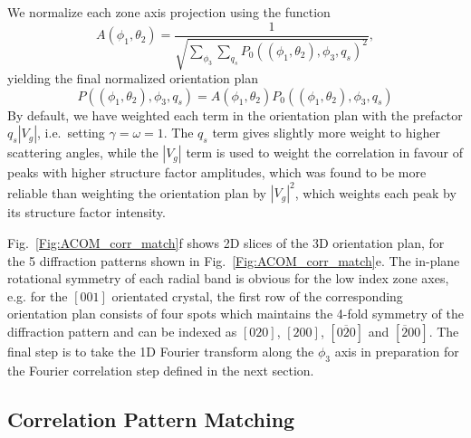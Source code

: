 \documentclass[%
 superscriptaddress,
 aip,
 amsmath,amssymb,
reprint,%
 author-year,%
longbibliography
]{revtex4-2}
\begin{document}
We normalize each zone axis projection using the function
\begin{equation}
    A(\phi_1, \theta_2) 
    = \frac{1}{\sqrt{
    \sum_{\phi_3}
    \sum_{q_s}
    {P_0((\phi_1, \theta_2), \phi_3, q_s)}^2
    }},
    \nonumber
\end{equation}
yielding the final normalized orientation plan
\begin{equation}
    P((\phi_1, \theta_2), \phi_3, q_s) = A(\phi_1, \theta_2) P_0((\phi_1, \theta_2), \phi_3, q_s)
\end{equation}
By default, we have weighted each term in the orientation plan with the prefactor $q_s |V_g|$, i.e.\ setting $\gamma=\omega=1$. The $q_s$ term gives slightly more weight to higher scattering angles, while the $|V_g|$ term is used to weight the correlation in favour of peaks with higher structure factor amplitudes, which was found to be more reliable than weighting the orientation plan by $|V_g|^2$, which weights each peak by its structure factor intensity. 

Fig.~\ref{Fig:ACOM_corr_match}f shows 2D slices of the 3D orientation plan, for the 5 diffraction patterns shown in Fig.~\ref{Fig:ACOM_corr_match}e. The in-plane rotational symmetry of each radial band is obvious for the low index zone axes, e.g. for the $[001]$ orientated crystal, the first row of the corresponding orientation plan consists of four spots which maintains the 4-fold symmetry of the diffraction pattern and can be indexed as $[020]$, $[200]$, $[0\overline{2}0]$ and $[\overline{2}00]$. The final step is to take the 1D Fourier transform along the $\phi_3$ axis in preparation for the Fourier correlation step defined in the next section.





\subsection*{Correlation Pattern Matching}
\end{document}
